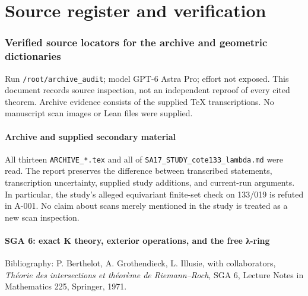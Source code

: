 \documentclass[
  10pt,
]{article}
\begin{document}
\part{Source register and verification}

\section{Verified source locators for the archive and geometric
dictionaries}\label{verified-source-locators-for-the-archive-and-geometric-dictionaries}

Run
\texttt{\small /\allowbreak{}root/\allowbreak{}archive\_\allowbreak{}audit};
model GPT-6 Astra Pro; effort not exposed. This document records source
inspection, not an independent reproof of every cited theorem. Archive
evidence consists of the supplied TeX transcriptions. No manuscript scan
images or Lean files were supplied.

\subsection{Archive and supplied secondary
material}\label{archive-and-supplied-secondary-material}

All thirteen \texttt{\small ARCHIVE\_\allowbreak{}*.tex} and all of
\texttt{\small SA17\_\allowbreak{}STUDY\_\allowbreak{}cote133\_\allowbreak{}lambda.md}
were read. The report preserves the difference between transcribed
statements, transcription uncertainty, supplied study additions, and
current-run arguments. In particular, the study's alleged equivariant
finite-set check on 133/019 is refuted in A-001. No claim about scans
merely mentioned in the study is treated as a new scan inspection.

\subsection{SGA 6: exact K theory, exterior operations, and the free
λ-ring}\label{sga-6-exact-k-theory-exterior-operations-and-the-free-ux3bb-ring}

Bibliography: P. Berthelot, A. Grothendieck, L. Illusie, with
collaborators, \emph{Théorie des intersections et théorème de
Riemann--Roch}, SGA 6, Lecture Notes in Mathematics 225, Springer, 1971.
\end{document}
